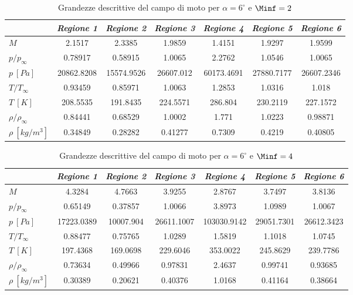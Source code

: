 \begin{table} [H]
	\centering 
	\begin{tabular}{l  c  c c c c c}   
		\toprule&   
		\emph{Regione 1}& \emph{Regione 2}& \emph{Regione 3}& \emph{Regione 4}& \emph{Regione 5}& \emph{Regione 6}   \\  \midrule$M$ &2.1517 &2.3385 &1.9859 &1.4151 &1.9297 &1.9599 \\$p/p_{\infty}$ &0.78917 &0.58915 &1.0065 &2.2762 &1.0546 &1.0065 \\
		$p \ [\si{Pa}]$ &20862.8208 &15574.9526 &26607.012 &60173.4691 &27880.7177 &26607.2346 \\
		$T/T_{\infty}$ &0.93459&0.85971&1.0063&1.2853&1.0316&1.018\\
		$T \ [K]$ &208.5535&191.8435&224.5571&286.804&230.2119&227.1572\\
		$\rho/\rho_{\infty}$ &0.84441&0.68529&1.0002&1.771&1.0223&0.98871\\
		$\rho \ [kg/m^3]$ &0.34849&0.28282&0.41277&0.7309&0.4219&0.40805\\
		\bottomrule
	\end{tabular}
	\caption {\footnotesize Grandezze descrittive del campo di moto per $\alpha=6^\circ$ e $\Minf=2$}\label{tabS6}
\end{table}			

\begin{table} [H]
	\centering {}
	\begin{tabular}{l  c  c c c c c}   
		\toprule&    
		\emph{Regione 1}& \emph{Regione 2}& \emph{Regione 3}& \emph{Regione 4}& \emph{Regione 5}& \emph{Regione 6}   \\  \midrule
		$M$ &4.3284 &4.7663 &3.9255 &2.8767 &3.7497 &3.8136 \\
		$p/p_{\infty}$ &0.65149 &0.37857 &1.0066 &3.8973 &1.0989 &1.0067 \\
		$p \ [\si{Pa}]$ &17223.0389 &10007.904 &26611.1007 &103030.9142 &29051.7301 &26612.3423 \\
		$T/T_{\infty}$ &0.88477&0.75765&1.0289&1.5819&1.1018&1.0745\\
		$T \ [K]$ &197.4368&169.0698&229.6046&353.0022&245.8629&239.7786\\
		$\rho/\rho_{\infty}$ &0.73634&0.49966&0.97831&2.4637&0.99741&0.93685\\
		$\rho \ [kg/m^3]$ &0.30389&0.20621&0.40376&1.0168&0.41164&0.38664\\
		\bottomrule
	\end{tabular}
	\caption {\footnotesize Grandezze descrittive del campo di moto per $\alpha=6^\circ$ e $\Minf=4$}\label{tabS7}\end{table}				

